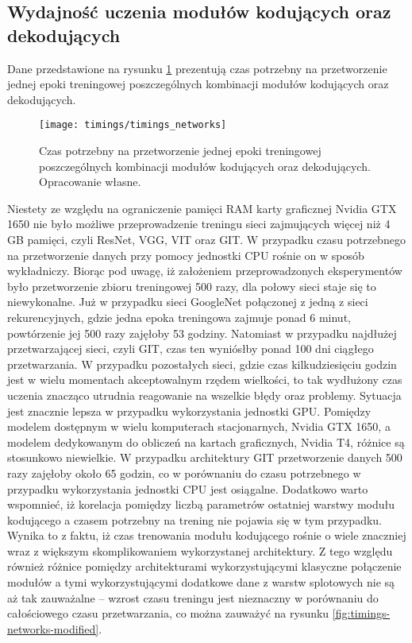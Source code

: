 \subsection{Wydajność uczenia modułów kodujących oraz dekodujących}
Dane przedstawione na rysunku \ref{fig:timings-networks} prezentują czas potrzebny na przetworzenie jednej epoki treningowej poszczególnych kombinacji modułów kodujących oraz dekodujących.
\begin{figure}[H]
    \centering
    \texttt{[image: timings/timings\_networks]}
    \caption{Czas potrzebny na przetworzenie jednej epoki treningowej poszczególnych kombinacji modułów kodujących oraz dekodujących. Opracowanie własne.}
    \label{fig:timings-networks}
\end{figure}
\noindent Niestety ze względu na ograniczenie pamięci RAM karty graficznej Nvidia GTX 1650 nie było możliwe przeprowadzenie treningu sieci zajmujących więcej niż 4 GB pamięci, czyli ResNet, VGG, VIT oraz GIT. W przypadku czasu potrzebnego na przetworzenie danych przy pomocy jednostki CPU rośnie on w sposób wykładniczy. Biorąc pod uwagę, iż założeniem przeprowadzonych eksperymentów było przetworzenie zbioru treningowej 500 razy, dla połowy sieci staje się to niewykonalne. Już w przypadku sieci GoogleNet połączonej z jedną z sieci rekurencyjnych, gdzie jedna epoka treningowa zajmuje ponad 6 minut, powtórzenie jej 500 razy zajęłoby 53 godziny. Natomiast w przypadku najdłużej przetwarzającej sieci, czyli GIT, czas ten wyniósłby ponad 100 dni ciągłego przetwarzania. W przypadku pozostałych sieci, gdzie czas kilkudziesięciu godzin jest w wielu momentach akceptowalnym rzędem wielkości, to tak wydłużony czas uczenia znacząco utrudnia reagowanie na wszelkie błędy oraz problemy. Sytuacja jest znacznie lepsza w przypadku wykorzystania jednostki GPU. Pomiędzy modelem dostępnym w wielu komputerach stacjonarnych, Nvidia GTX 1650, a modelem dedykowanym do obliczeń na kartach graficznych, Nvidia T4, różnice są stosunkowo niewielkie. W przypadku architektury GIT przetworzenie danych 500 razy zajęłoby około 65 godzin, co w porównaniu do czasu potrzebnego w przypadku wykorzystania jednostki CPU jest osiągalne. Dodatkowo warto wspomnieć, iż korelacja pomiędzy liczbą parametrów ostatniej warstwy modułu kodującego a czasem potrzebny na trening nie pojawia się w tym przypadku. Wynika to z faktu, iż czas trenowania modułu kodującego rośnie o wiele znaczniej wraz z większym skomplikowaniem wykorzystanej architektury. Z tego względu również różnice pomiędzy architekturami wykorzystującymi klasyczne połączenie modułów a tymi wykorzystującymi dodatkowe dane z warstw splotowych nie są aż tak zauważalne -- wzrost czasu treningu jest nieznaczny w porównaniu do całościowego czasu przetwarzania, co można zauważyć na rysunku \ref{fig:timings-networks-modified}.
